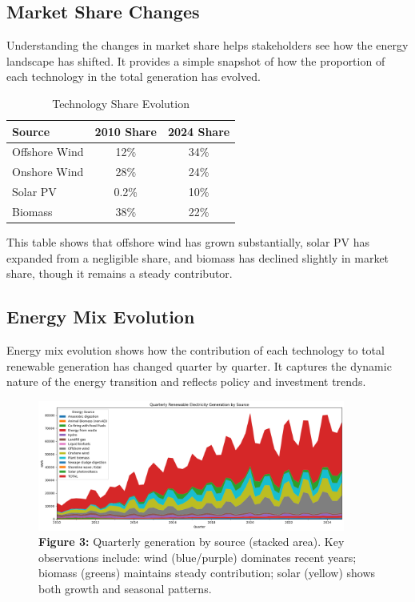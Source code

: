 \documentclass[11pt]{article}
\begin{document}
\subsection{Market Share Changes}
Understanding the changes in market share helps stakeholders see how the energy landscape has shifted. It provides a simple snapshot of how the proportion of each technology in the total generation has evolved.

\begin{table}[ht]
  \centering
  \caption{Technology Share Evolution}
  \begin{tabular}{lcc}
    \toprule
    \textbf{Source} & \textbf{2010 Share} & \textbf{2024 Share} \\
    \midrule
    Offshore Wind & 12\% & 34\% \\
    Onshore Wind & 28\% & 24\% \\
    Solar PV & 0.2\% & 10\% \\
    Biomass & 38\% & 22\% \\
    \bottomrule
  \end{tabular}
\end{table}

This table shows that offshore wind has grown substantially, solar PV has expanded from a negligible share, and biomass has declined slightly in market share, though it remains a steady contributor.

\subsection{Energy Mix Evolution}
Energy mix evolution shows how the contribution of each technology to total renewable generation has changed quarter by quarter. It captures the dynamic nature of the energy transition and reflects policy and investment trends.

\begin{figure}[ht]
  \centering
  \includegraphics[width=0.9\textwidth]{output_17_0.png}
  \caption*{\textbf{Figure 3:} Quarterly generation by source (stacked area). Key observations include: wind (blue/purple) dominates recent years; biomass (greens) maintains steady contribution; solar (yellow) shows both growth and seasonal patterns.}
\end{figure}
\end{document}
